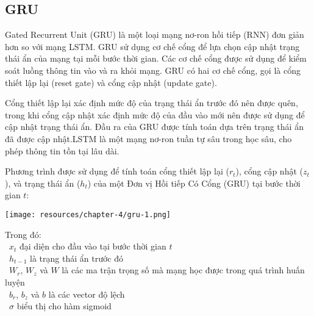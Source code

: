 \subsection{GRU}
Gated Recurrent Unit (GRU) là một loại mạng nơ-ron hồi tiếp (RNN) đơn giản hơn so với mạng LSTM. GRU sử dụng cơ chế cổng để lựa chọn cập nhật trạng thái ẩn của mạng tại mỗi bước thời gian. Các cơ chế cổng được sử dụng để kiểm soát luồng thông tin vào và ra khỏi mạng. GRU có hai cơ chế cổng, gọi là cổng thiết lập lại (reset gate) và cổng cập nhật (update gate).
\par
Cổng thiết lập lại xác định mức độ của trạng thái ẩn trước đó nên được quên, trong khi cổng cập nhật xác định mức độ của đầu vào mới nên được sử dụng để cập nhật trạng thái ẩn. Đầu ra của GRU được tính toán dựa trên trạng thái ẩn đã được cập nhật.LSTM là một mạng nơ-ron tuần tự sâu trong học sâu, cho phép thông tin tồn tại lâu dài.
\par
Phương trình được sử dụng để tính toán cổng thiết lập lại (\(r_t\)), cổng cập nhật (\(z_t\)), và trạng thái ẩn (\(h_t\)) của một Đơn vị Hồi tiếp Có Cổng (GRU) tại bước thời gian \(t\):

\begin{minipage}{0.45\textwidth}
\centering
\texttt{[image: resources/chapter-4/gru-1.png]}
\end{minipage}

Trong đó:\\
    \indent\textbullet\ \(x_t\) đại diện cho đầu vào tại bước thời gian \(t\)\\
    \indent\textbullet\ \(h_{t-1}\)  là trạng thái ẩn trước đó \\
    \indent\textbullet\ \(W_r\), \(W_z\) và \(W\) là các ma trận trọng số mà mạng học được trong quá trình huấn luyện\\
    \indent\textbullet\ \(b_r\), \(b_z\) và \(b\) là các vector độ lệch\\
    \indent\textbullet\ \(\sigma\) biểu thị cho hàm sigmoid
    

